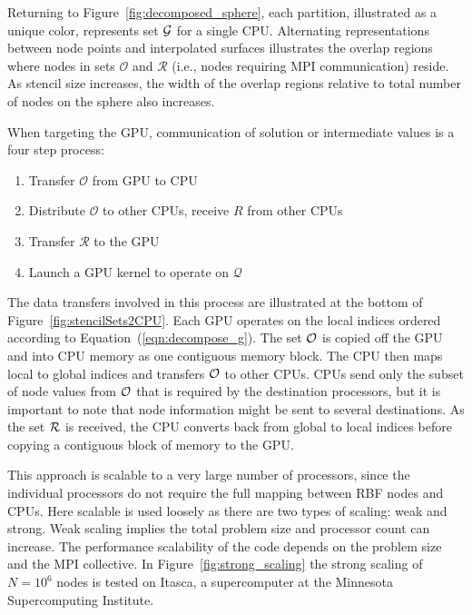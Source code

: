 \documentclass{report}
\begin{document}

Returning to Figure~\ref{fig:decomposed_sphere}, each partition, illustrated
as a unique color, represents set $\mathcal{G}$ for a single CPU.  Alternating
representations between node points and interpolated surfaces illustrates the
overlap regions where nodes in sets $\mathcal{O}$ and $\mathcal{R}$ (i.e., nodes
requiring MPI communication) reside. As stencil size increases, the width of the
overlap regions relative to total number of nodes on the sphere also increases. 




When targeting the GPU, communication of solution or intermediate values is a four step process:
        \begin{enumerate}
    \item Transfer $\mathcal{O}$ from GPU to CPU
	\item Distribute $\mathcal{O}$ to other CPUs, receive $R$ from other CPUs
	\item Transfer $\mathcal{R}$ to the GPU
	\item Launch a GPU kernel to operate on $\mathcal{Q}$
     \end{enumerate} 
The data transfers involved in this process are illustrated at the bottom of Figure~\ref{fig:stencilSets2CPU}.
    Each GPU operates on the local indices ordered 
according to Equation~(\ref{eqn:decompose_g}). The set 
$\mathcal{O}$ is copied off the GPU and into CPU memory as one contiguous memory block. The CPU then maps local to global indices and transfers $\mathcal{O}$ to other CPUs. CPUs send only the subset of node values from $\mathcal{O}$ that is required by the destination processors, but it is important to note that node information might be sent to several destinations. 
As the set $\mathcal{R}$ is received, the CPU converts back from global to local indices before copying a contiguous block of memory to the GPU. 



        This approach is scalable to a very large number of 
		processors, since the individual processors do not require the 
		full mapping between RBF nodes and CPUs. Here scalable is used loosely as there are two types of scaling: weak and strong. Weak scaling implies the total problem size and processor count can increase. The performance scalability of the code depends on the problem size and the MPI collective. In Figure~\ref{fig:strong_scaling} the strong scaling of $N=10^6$ nodes is tested on Itasca, a supercomputer at the Minnesota Supercomputing Institute.   
\end{document}

